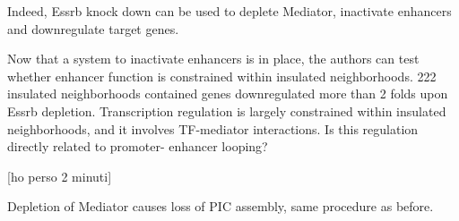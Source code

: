Indeed, Essrb knock down can be used to deplete Mediator, inactivate enhancers and downregulate target genes.

Now that a system to inactivate enhancers is in place, the authors can test whether enhancer function is constrained within insulated neighborhoods. 222 insulated neighborhoods contained genes downregulated more than 2 folds upon Essrb depletion. Transcription regulation is largely constrained within insulated neighborhoods, and it involves TF-mediator interactions. Is this regulation directly related to promoter- enhancer looping?

{[}ho perso 2 minuti{]}

Depletion of Mediator causes loss of PIC assembly, same procedure as before.
